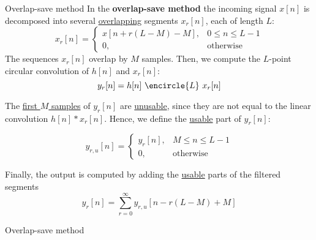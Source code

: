 \documentclass[10pt, aspectratio=169]{beamer}
\begin{document}
%
\begin{frame}{Overlap-save method}
In the \textbf{overlap-save method} the incoming signal $x[n]$ is decomposed into several \underline{overlapping} segments $x_r[n]$, each of length $L$:
\begin{equation*}
x_r[n] = \begin{cases}
x[n + r(L-M)-M], & 0 \leq n \leq L-1\\
0, & \text{otherwise}
\end{cases}
\end{equation*}
The sequences $x_r[n]$ overlap by $M$ samples. Then, we compute the $L$-point circular convolution of $h[n]$ and $x_r[n]$:
\begin{equation*}
y_r[n] = h[n]~\encircle{L}~x_r[n]
\end{equation*}

The \underline{first $M$ samples} of $y_r[n]$ are \underline{unusable}, since they are not equal to the linear convolution  $h[n]\ast x_r[n]$. Hence, we define the \underline{usable} part of $y_r[n]$:

\begin{equation*}
y_{r,u}[n] = \begin{cases}
y_r[n], & M \leq n \leq L-1 \\
0, &\text{otherwise}
\end{cases}
\end{equation*}

Finally, the output is computed by adding the \underline{usable} parts of the filtered segments
\begin{equation*}
y_r[n] = \sum_{r = 0}^{\infty} y_{r, u}[n - r(L - M) + M]
\end{equation*}
\end{frame}

%
\begin{frame}{Overlap-save method}
\begin{center}
	\resizebox{0.62\textwidth}{!}{}
\end{center}	
\end{frame}
\end{document}
